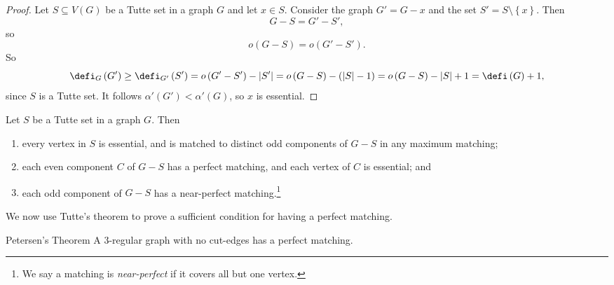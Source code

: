 \documentclass[co342]{subfiles}
\begin{document}
    \begin{proof}
        Let $S\subseteq V\left( G \right)$ be a Tutte set in a graph $G$ and let $x\in S$. Consider the graph $G'=G-x$ and the set $S'=S\setminus \left\lbrace x \right\rbrace$. Then
        \begin{equation*}
            G-S = G'-S',
        \end{equation*}
        so
        \begin{equation*}
            o\left( G-S \right) = o\left( G'-S' \right).
        \end{equation*}
        So
        \begin{equation*}
            \defi_G\left( G' \right)\geq\defi_{G'}\left( S' \right)=o\left( G'-S' \right)-\left| S' \right|=o\left( G-S \right)-\left( \left| S \right|-1 \right)=o\left( G-S \right)-\left| S \right|+1 =\defi\left( G \right)+1,
        \end{equation*}
        since $S$ is a Tutte set. It follows $\alpha'\left( G' \right)<\alpha'\left( G \right)$, so $x$ is essential.
    \end{proof}

    \begin{cor}{}
        Let $S$ be a Tutte set in a graph $G$. Then
        \begin{enumerate}
            \item every vertex in $S$ is essential, and is matched to distinct odd components of $G-S$ in any maximum matching;
            \item each even component $C$ of $G-S$ has a perfect matching, and each vertex of $C$ is essential; and
            \item each odd component of $G-S$ has a near-perfect matching.\footnote{We say a matching is \emph{near-perfect} if it covers all but one vertex.}
        \end{enumerate}
    \end{cor}	

    \np We now use Tutte's theorem to prove a sufficient condition for having a perfect matching.

    \begin{cor}{Petersen's Theorem}
        A $3$-regular graph with no cut-edges has a perfect matching.
    \end{cor}	
\end{document}
